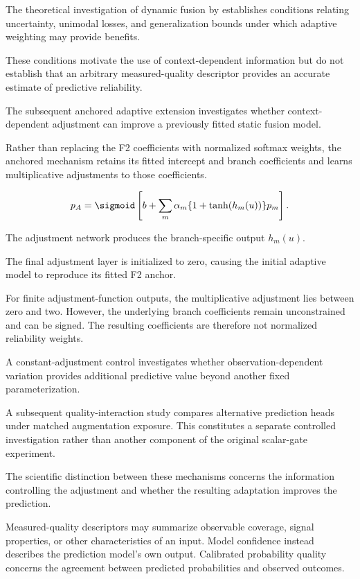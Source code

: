 The theoretical investigation of dynamic fusion by \textcite{Zhang2023QMF} establishes conditions relating uncertainty, unimodal losses, and generalization bounds under which adaptive weighting may provide benefits.

These conditions motivate the use of context-dependent information but do not establish that an arbitrary measured-quality descriptor provides an accurate estimate of predictive reliability.

The subsequent anchored adaptive extension investigates whether context-dependent adjustment can improve a previously fitted static fusion model.

Rather than replacing the F2 coefficients with normalized softmax weights, the anchored mechanism retains its fitted intercept and branch coefficients and learns multiplicative adjustments to those coefficients.

\begin{equation}
 p_A=\sigmoid\left[b+\sum_m\alpha_m\{1+\tanh(h_m(u))\}p_m\right].
 \label{eq:anchored}
\end{equation}

The adjustment network produces the branch-specific output \(h_m(u)\).

The final adjustment layer is initialized to zero, causing the initial adaptive model to reproduce its fitted F2 anchor.

For finite adjustment-function outputs, the multiplicative adjustment lies between zero and two. However, the underlying branch coefficients remain unconstrained and can be signed. The resulting coefficients are therefore not normalized reliability weights.

A constant-adjustment control investigates whether observation-dependent variation provides additional predictive value beyond another fixed parameterization.

A subsequent quality-interaction study compares alternative prediction heads under matched augmentation exposure. This constitutes a separate controlled investigation rather than another component of the original scalar-gate experiment.

The scientific distinction between these mechanisms concerns the information controlling the adjustment and whether the resulting adaptation improves the prediction.

Measured-quality descriptors may summarize observable coverage, signal properties, or other characteristics of an input. Model confidence instead describes the prediction model’s own output. Calibrated probability quality concerns the agreement between predicted probabilities and observed outcomes.

